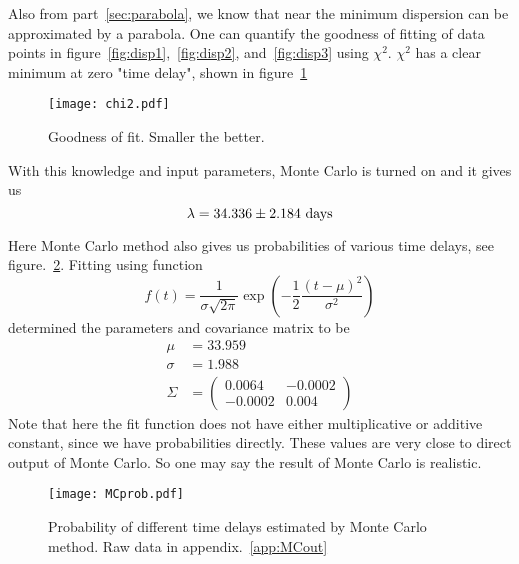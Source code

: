 Also from part~\ref{sec:parabola}, we know that near the minimum dispersion can be approximated by a parabola. One can quantify the goodness of fitting of data points in figure~\ref{fig:disp1},~\ref{fig:disp2}, and~\ref{fig:disp3} using $\chi^2$. $\chi^2$ has a clear minimum at zero "time delay", shown in figure~\ref{fig:chi2}
\begin{figure}[ht]
	\centering
	\texttt{[image: chi2.pdf]}
	\caption{Goodness of fit. Smaller the better.}%
	\label{fig:chi2}
\end{figure}

With this knowledge and input parameters, Monte Carlo is turned on and it gives us
\begin{equation}
	\lambda = \num{34.336 +- 2.184} \text{ days}
\end{equation}

Here Monte Carlo method also gives us probabilities of various time delays, see figure.~\ref{fig:MCprob}. Fitting using function
\begin{equation*}
	f(t) = \frac{1}{\sigma \sqrt{2\pi}} \exp(-\frac{1}{2} \frac{(t-\mu)^2}{\sigma^2}) 
\end{equation*}
determined the parameters and covariance matrix to be
\begin{align*}
	\mu &= 33.959 \\
	\sigma &= 1.988 \\
	\Sigma &= \begin{pmatrix} 0.0064 & -0.0002 \\ -0.0002 & 0.004 \end{pmatrix}
\end{align*}
Note that here the fit function does not have either multiplicative or additive constant, since we have probabilities directly. These values are very close to direct output of Monte Carlo. So one may say the result of Monte Carlo is realistic.
\begin{figure}[ht]
	\centering
	\texttt{[image: MCprob.pdf]}
	\caption{Probability of different time delays estimated by Monte Carlo method. Raw data in appendix.~\ref{app:MCout}}%
	\label{fig:MCprob}
\end{figure}

